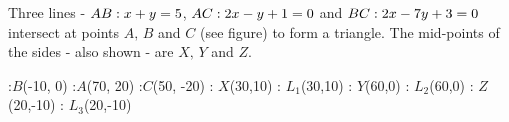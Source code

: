 




\FRACMINUS{}\pax\qax
{}\pax\qax\pay\qay

\FRACMULT{}\tp\tq
\FRACMINUS\tp\tq{}\pbx\qbx
{}\va\pbx\qbx\pby\qby

\FRACMULT{}\tp\tq
\FRACMINUS{}\tp\tq\pcx\qcx
{}\pcx\qcx\pcy\qcy


\FRACADD\pax\qax\pbx\qbx\tp\tq
\FRACDIV\tp{}\pxx\qxx %
\FRACADD\pay\qay\pby\qby\tp\tq
\FRACDIV\tp{}\pxy\qxy %

\FRACADD\pax\qax\pcx\qcx\tp\tq
\FRACDIV\tp{}\pyx\qyx %
\FRACADD\pay\qay\pcy\qcy\tp\tq
\FRACDIV\tp{}\pyy\qyy %

\FRACADD\pbx\qbx\pcx\qcx\tp\tq
\FRACDIV\tp{}\pzx\qzx %
\FRACADD\pby\qby\pcy\qcy\tp\tq
\FRACDIV\tp{}\pzy\qzy %

\FRACMINUS\pxy\qxy\pxx\qxx\mx\nx
\FRACMULT\pyx{}\tp\tq
\FRACMINUS\pyy\qyy\tp\tq\my\ny
\FRACMULT\pzx{}\tp\tq
\FRACMINUS\pzy\qzy\tp\tq\mz\nz

\FRACMINUS\my\ny\mx\nx\ansxp\ansxq
\FRACMULT\ansxp{}\ansxp\ansxq
\FRACADD\ansxp\ansxq\mx\nx\ansyp\ansyq

\question Three lines - $AB: x + y = 5$, $AC: 2x - y + 1 = 0$  
and $BC: 2x - 7y + 3 = 0$ intersect at points $A,\, B$ and $C$ (see figure) to form 
a triangle. The mid-points of the sides - also shown - are $X,\,Y$ and $Z$.

\watchout

  :$B$(-10, 0)
  :$A$(70, 20)
  :$C$(50, -20)
  : $X$(30,10)
  : $L_1$(30,10)
  : $Y$(60,0)
  : $L_2$(60,0)
  : $Z$(20,-10)
  : $L_3$(20,-10)
\figdrawbegin{}
  \figdrawline [10, 20]
  \figdrawline [20, 30]
  \figdrawline [30, 10]
\figdrawend
{}

